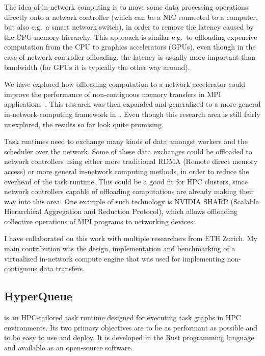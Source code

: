 The idea of in-network computing is to move some data processing operations directly onto a
network controller (which can be a NIC connected to a computer, but also e.g.\ a smart network
switch), in order to remove the latency caused by the CPU memory hierarchy. This
approach is similar e.g.\ to offloading expensive computation from the CPU to graphics
accelerators (GPUs), even though in the case of network controller offloading, the latency is
usually more important than bandwidth (for GPUs it is typically the other way around).

We have explored how offloading computation to a network accelerator could improve the
performance of non-contiguous memory transfers in MPI applications~\cite{spin}. This
research was then expanded and generalized to a more general in-network computing framework
in~\cite{spin2}. Even though this research area is still fairly unexplored, the results so far
look quite promising.

Task runtimes need to exchange many kinds of data amongst workers and the scheduler over
the network. Some of these data exchanges could be offloaded to network controllers using either
more traditional RDMA (Remote direct memory access) or more general in-network computing
methods, in order to reduce the overhead of the task runtime. This could be a good fit for HPC
clusters, since network controllers capable of offloading computations are already making their
way into this area. One example of such technology is NVIDIA SHARP (Scalable Hierarchical
Aggregation and Reduction Protocol), which allows offloading collective operations of MPI
programs to networking devices.

I have collaborated on this work with multiple researchers from ETH Zurich. My main
contribution was the design, implementation and benchmarking of a virtualized in-network compute
engine that was used for implementing non-contiguous data transfers.

\subsection{HyperQueue}
\label{subsec:hyperqueue}
\hyperqueue{} is an HPC-tailored task runtime designed for executing task graphs in HPC
environments. Its two primary objectives are to be as performant as possible and to be easy to use
and deploy. It is developed in the Rust programming language and available as an open-source
software.

